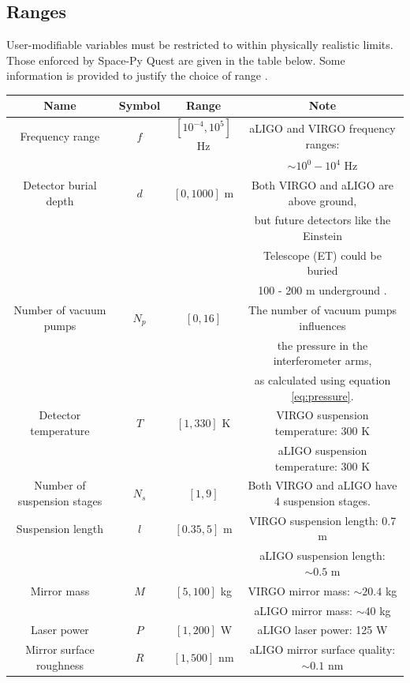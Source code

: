 \documentclass{article}
\begin{document}
\begin{appendix}
\subsection{Ranges}
\label{sec:ranges}
User-modifiable variables must be restricted to within physically realistic limits. Those enforced by Space-Py Quest are given in the table below. Some information is provided to justify the choice of range \cite{advLIGO}\cite{VIRGO}.
\begin{center}
    \begin{tabular}{ |c|c|c|c| } 
     \hline
     \textbf{Name} & \textbf{Symbol}  & \textbf{Range} & \textbf{Note}\\     
     \hline
     Frequency range  & $f$ & $[10^{-4}, 10^5]$ Hz & aLIGO and VIRGO frequency ranges: \\ 
     &  &  &  $\sim 10^0 - 10^4$ Hz\\
     \hline
     Detector burial depth & $d$ & $[0, 1000]$ m & Both VIRGO and aLIGO are above ground, \\
     & & & but future detectors like the Einstein \\
     & & & Telescope (ET) could be buried \\ 
     & & & 100 - 200 m underground \cite{ET}.\\ 
     \hline
     Number of vacuum pumps & $N_p$ & $[0, 16]$ &
            The number of vacuum pumps influences \\
     & & &  the pressure in the interferometer arms, \\
     & & & as calculated using equation \ref{eq:pressure}.\\ 
     \hline
     Detector temperature & $T$ & $[1, 330]$ K &
            VIRGO suspension temperature: 300 K\\
     & & & aLIGO suspension temperature: 300 K\\ 
     \hline
     Number of suspension stages & $N_s$ & $[1, 9]$ & 
            Both VIRGO and aLIGO have 4 suspension stages.\\ 
     \hline
    Suspension length & $l$ & $[0.35, 5]$ m &
            VIRGO suspension length: 0.7 m \\
    & & & aLIGO suspension length: $\sim 0.5$ m\\ 
    \hline
    Mirror mass& $M$ & $[5, 100]$ kg &
            VIRGO mirror mass: $\sim 20.4$ kg\\
    & & & aLIGO mirror mass: $\sim 40$ kg\\ 
    \hline
    Laser power & $P$ & $[1, 200]$ W &
            aLIGO laser power: 125 W\\ 
    \hline
    Mirror surface roughness& $R$ & $[1, 500]$ nm &
            aLIGO mirror surface quality: $\sim 0.1$ nm\\ 
    \hline
    \end{tabular}
\end{center}


\end{appendix}
\end{document}
